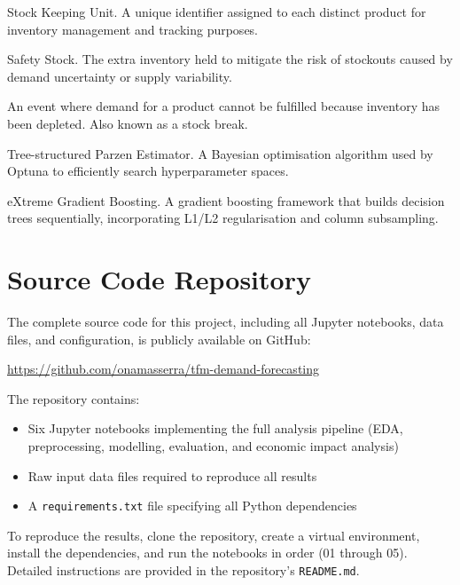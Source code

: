 \documentclass[ENG]{TFUOC}%
\begin{document}
\begin{description}[style=nextline, leftmargin=3.5cm, labelwidth=3.2cm]
\item[SKU] Stock Keeping Unit. A unique identifier assigned to each distinct product for inventory management and tracking purposes.

\item[SS] Safety Stock. The extra inventory held to mitigate the risk of stockouts caused by demand uncertainty or supply variability.

\item[Stockout] An event where demand for a product cannot be fulfilled because inventory has been depleted. Also known as a stock break.

\item[TPE] Tree-structured Parzen Estimator. A Bayesian optimisation algorithm used by Optuna to efficiently search hyperparameter spaces.

\item[XGBoost] eXtreme Gradient Boosting. A gradient boosting framework that builds decision trees sequentially, incorporating L1/L2 regularisation and column subsampling.

\end{description}





\newpage
\appendix

\chapter{Source Code Repository}

The complete source code for this project, including all Jupyter notebooks, data files, and configuration, is publicly available on GitHub:

\begin{center}
\url{https://github.com/onamasserra/tfm-demand-forecasting}
\end{center}

The repository contains:
\begin{itemize}
    \item Six Jupyter notebooks implementing the full analysis pipeline (EDA, preprocessing, modelling, evaluation, and economic impact analysis)
    \item Raw input data files required to reproduce all results
    \item A \texttt{requirements.txt} file specifying all Python dependencies
\end{itemize}

To reproduce the results, clone the repository, create a virtual environment, install the dependencies, and run the notebooks in order (01 through 05). Detailed instructions are provided in the repository's \texttt{README.md}.
\end{document}
